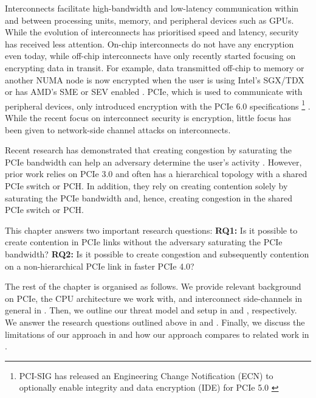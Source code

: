 
Interconnects facilitate high-bandwidth and low-latency communication within and between processing units, memory, and peripheral devices such as GPUs.
While the evolution of interconnects has prioritised speed and latency, security has received less attention.
On-chip interconnects do not have any encryption even today, while off-chip interconnects have only recently started focusing on encrypting data in transit.
For example, data transmitted off-chip to memory or another NUMA node is now encrypted when the user is using Intel's SGX/TDX or has AMD's SME or SEV enabled \cite{intel_upi_encryption, amd_gen_5_arch}.
PCIe, which is used to communicate with peripheral devices, only introduced encryption with the PCIe 6.0 specifications 
\footnote{PCI-SIG has released an Engineering Change Notification (ECN) to optionally enable integrity and data encryption (IDE) for PCIe 5.0 \cite{pcie_ide_v5_ecn}}
\cite{pcie_ide_v6}.
While the recent focus on interconnect security is encryption, little focus has been given to network-side channel attacks on interconnects.

Recent research has demonstrated that creating congestion by saturating the PCIe bandwidth can help an adversary determine the user's activity \cite{tan2021invisible, giechaskiel2022cross, side2022lockeddown}.
However, prior work \cite{tan2021invisible, giechaskiel2022cross, side2022lockeddown} relies on PCIe 3.0 and often has a hierarchical topology with a shared PCIe switch or PCH.
In addition, they rely on creating contention solely by saturating the PCIe bandwidth and, hence, creating congestion in the shared PCIe switch or PCH.

This chapter answers two important research questions:
\textbf{RQ1:} Is it possible to create contention in PCIe links without the adversary saturating the PCIe bandwidth?
\textbf{RQ2:} Is it possible to create congestion and subsequently contention on a non-hierarchical PCIe link in faster PCIe 4.0?

The rest of the chapter is organised as follows.
We provide relevant background on PCIe, the CPU architecture we work with, and interconnect side-channels in general in . 
Then, we outline our threat model and setup in  and , respectively.
We answer the research questions outlined above in  and .
Finally, we discuss the limitations of our approach in  and how our approach compares to related work in .
